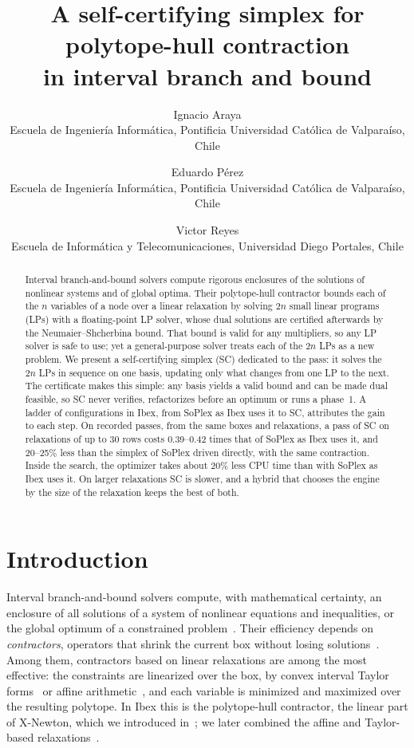 \documentclass[11pt]{article}
\title{A self-certifying simplex for polytope-hull contraction\\ in interval branch and bound}
\author{Ignacio Araya\\
\small Escuela de Ingenier\'ia Inform\'atica, Pontificia Universidad Cat\'olica de Valpara\'iso, Chile
\and Eduardo P\'erez\\
\small Escuela de Ingenier\'ia Inform\'atica, Pontificia Universidad Cat\'olica de Valpara\'iso, Chile
\and Victor Reyes\\
\small Escuela de Inform\'atica y Telecomunicaciones, Universidad Diego Portales, Chile}
\date{}
\theoremstyle{definition}
\theoremstyle{remark}
\begin{document}
\maketitle

\begin{abstract}
Interval branch-and-bound solvers compute rigorous enclosures of the solutions
of nonlinear systems and of global optima. Their polytope-hull contractor
bounds each of the $n$ variables of a node over a linear relaxation by solving
$2n$ small linear programs (LPs) with a floating-point LP solver, whose dual
solutions are certified afterwards by the Neumaier--Shcherbina bound. That
bound is valid for any multipliers, so any LP solver is safe to use; yet a general-purpose solver treats each of the $2n$ LPs as a new
problem. We present a self-certifying simplex (SC) dedicated to the pass: it
solves the $2n$ LPs in sequence on one basis, updating only what changes from
one LP to the next. The certificate makes this simple: any basis yields a valid bound and can
be made dual feasible, so SC never verifies, refactorizes before an optimum
or runs a phase~1. A ladder of configurations in Ibex, from SoPlex as Ibex uses it to SC,
attributes the gain to each step. On recorded passes, from the same boxes and relaxations, a pass of SC on
relaxations of up to 30 rows costs 0.39--0.42 times that of SoPlex as Ibex
uses it, and 20--25\% less than the simplex of SoPlex driven directly, with
the same contraction. Inside the search, the optimizer takes about 20\% less CPU time than with
SoPlex as Ibex uses it. On larger relaxations SC is slower, and a hybrid that chooses the engine by
the size of the relaxation keeps the best of both.
\end{abstract}

\section{Introduction}\label{sec:intro}

Interval branch-and-bound solvers compute, with mathematical certainty, an
enclosure of all solutions of a system of nonlinear equations and inequalities,
or the global optimum of a constrained problem~\cite{neumaier2004complete}.
Their efficiency depends on \emph{contractors}, operators that shrink the
current box without losing solutions~\cite{chabert2009contractor}. Among them,
contractors based on linear relaxations are among the most effective: the
constraints are linearized over the box, by convex interval
Taylor forms~\cite{araya2012xnewton} or affine
arithmetic~\cite{ninin2015affine,araya2025hybridizing}, and each variable is
minimized and maximized over the resulting polytope. In Ibex this is the
polytope-hull contractor, the linear part of X-Newton, which we introduced
in~\cite{araya2012xnewton}; we later combined the affine and Taylor-based
relaxations~\cite{araya2025hybridizing}.
\end{document}
